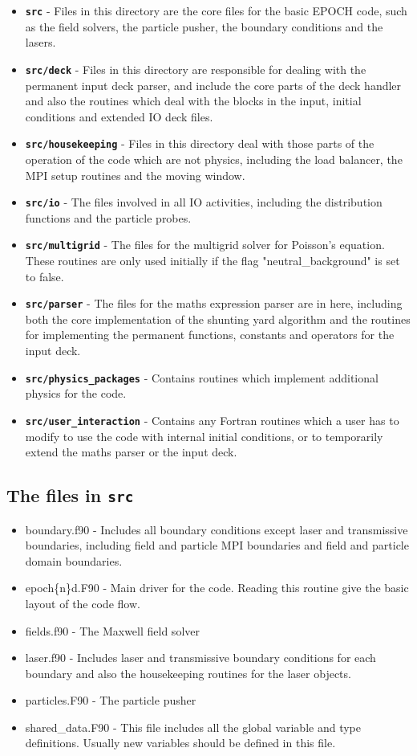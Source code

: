 \documentclass[12pt]{article}
\newcommand{\inlinecode}[1]{{\color{warwickred} \bf\texttt{#1}}}
\newcommand{\EPOCH}{{\color{warwickdark}\fontfamily{phv}\selectfont EPOCH} }
\begin{document}
\begin{itemize}
\item \inlinecode{src} - Files in this directory are the core files for the
  basic \EPOCH code, such as the field solvers, the particle pusher, the
  boundary conditions and the lasers.
\item \inlinecode{src/deck} - Files in this directory are responsible for
  dealing with the permanent input deck parser, and include the core parts of
  the deck handler and also the routines which deal with the blocks in the
  input, initial conditions and extended IO deck files.
\item \inlinecode{src/housekeeping} - Files in this directory deal with those
  parts of the operation of the code which are not physics, including the load
  balancer, the MPI setup routines and the moving window.
\item \inlinecode{src/io} - The files involved in all IO activities, including
  the distribution functions and the particle probes.
\item \inlinecode{src/multigrid} - The files for the multigrid solver for
  Poisson's equation. These routines are only used initially if the flag
  "neutral\_background" is set to false.
\item \inlinecode{src/parser} - The files for the maths expression parser are
  in here, including both the core implementation of the shunting yard
  algorithm and the routines for implementing the permanent functions,
  constants and operators for the input deck.
\item \inlinecode{src/physics\_packages} - Contains routines which implement
  additional physics for the code.
\item \inlinecode{src/user\_interaction} - Contains any Fortran routines which
  a user has to modify to use the code with internal initial conditions, or to
  temporarily extend the maths parser or the input deck.
\end{itemize}

\subsection{The files in \inlinecode{src}}
\begin{itemize}
\item boundary.f90 - Includes all boundary conditions except laser and
  transmissive boundaries, including field and particle MPI boundaries and
  field and particle domain boundaries.
\item epoch\{n\}d.F90 - Main driver for the code. Reading this routine give
  the basic layout of the code flow.
\item fields.f90 - The Maxwell field solver
\item laser.f90 - Includes laser and transmissive boundary conditions for each
  boundary and also the housekeeping routines for the laser objects.
\item particles.F90 - The particle pusher
\item shared\_data.F90 - This file includes all the global variable and type
  definitions. Usually new variables should be defined in this file.
\end{itemize}
\end{document}
